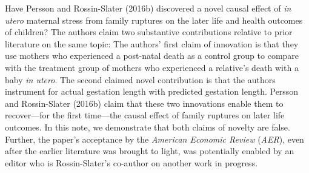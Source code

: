 \documentclass[a4paper,12pt]{article}
\begin{document}
Have Persson and Rossin-Slater (2016b) discovered a novel causal effect of \emph{in utero} maternal stress from family ruptures on the later life and health outcomes of children? The authors claim two substantive contributions relative to prior literature on the same topic: The authors' first claim of innovation is that they use mothers who experienced a post-natal death as a control group to compare with the treatment group of mothers who experienced a relative's death with a baby \emph{in utero}. The second claimed novel contribution is that the authors instrument for actual gestation length with predicted gestation length. Persson and Rossin-Slater (2016b) claim that these two innovations enable them to recover---for the first time---the causal effect of family ruptures on later life outcomes.  In this note, we demonstrate that both claims of novelty are false. Further, the paper's acceptance by the \emph{American Economic Review} (\emph{AER}), even after the earlier literature was brought to light, was potentially enabled by an editor who is Rossin-Slater's co-author on another work in progress.
\end{document}
